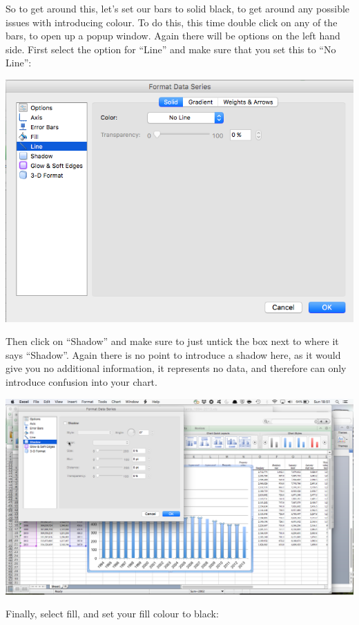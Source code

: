 \documentclass[]{book}
\theoremstyle{definition}
\theoremstyle{definition}
\theoremstyle{definition}
\theoremstyle{remark}
\begin{document}
So to get around this, let's set our bars to solid black, to get around
any possible issues with introducing colour. To do this, this time
double click on any of the bars, to open up a popup window. Again there
will be options on the left hand side. First select the option for
``Line'' and make sure that you set this to ``No Line'':

\includegraphics{imgs/desc_viz_11.png}

Then click on ``Shadow'' and make sure to just untick the box next to
where it says ``Shadow''. Again there is no point to introduce a shadow
here, as it would give you no additional information, it represents no
data, and therefore can only introduce confusion into your chart.

\includegraphics{imgs/desc_viz_12.png}

Finally, select fill, and set your fill colour to black:
\end{document}
